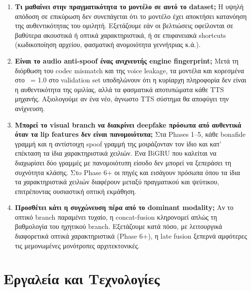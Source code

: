 \begin{enumerate}

  \item \textbf{Τι μαθαίνει στην πραγματικότητα το μοντέλο σε αυτό το dataset;}
    Η υψηλή απόδοση σε επικύρωση δεν συνεπάγεται ότι το μοντέλο
    έχει αποκτήσει κατανόηση της αυθεντικότητας του ομιλητή.
    Εξετάζουμε εάν οι βελτιώσεις οφείλονται σε βαθύτερα ακουστικά
    ή οπτικά χαρακτηριστικά, ή σε επιφανειακά shortcuts
    (κωδικοποίηση αρχείου, φασματική ανομοιότητα γεννήτριας κ.ά.).

  \item \textbf{Είναι το audio anti-spoof ένας ανιχνευτής engine fingerprint;}
    Μετά τη διόρθωση του codec mismatch και της voice leakage,
    τα μοντέλα  και  κορεσμένα
    στο \AUC{}~= 1.0 στο validation set υποδηλώνουν ότι
    η κυρίαρχη πληροφορία δεν είναι η αυθεντικότητα της ομιλίας,
    αλλά τα φασματικά αποτυπώματα κάθε TTS μηχανής.
    Αξιολογούμε αν ένα νέο, άγνωστο TTS σύστημα
    θα αποφύγει την ανίχνευση.

  \item \textbf{Μπορεί το visual branch να διακρίνει deepfake πρόσωπα από
    αυθεντικά όταν τα lip features δεν είναι πανομοιότυπα;}
    Στα Phases 1–5, κάθε bonafide γραμμή και η αντίστοιχη spoof γραμμή
    της μοιράζονταν τον ίδιο 
    και κατ' επέκταση τα ίδια  χαρακτηριστικά χειλιών.
    Ένα BiGRU που καλείται να διαχωρίσει δύο γραμμές με πανομοιότυπη
    είσοδο δεν μπορεί να ξεπεράσει τη συχνότητα κλάσης.
    Στo Phase 6+ οι πηγές  και 
    εισάγουν πρόσωπα όπου τα ίδια τα χαρακτηριστικά χειλιών διαφέρουν
    μεταξύ πραγματικού και ψεύτικου, επιτρέποντας ουσιαστική
    οπτική εκμάθηση.

  \item \textbf{Προσθέτει κάτι η συγχώνευση πέρα από το dominant modality;}
    Αν το οπτικό branch παραμένει τυχαίο, η concat-fusion
    κληρονομεί απλώς τη βαθμολογία του ηχητικού branch.
    Εξετάζουμε κατά πόσο, με λειτουργικά διαφορετικά οπτικά
    χαρακτηριστικά (Phase 6+), η late fusion ξεπερνά
    αμφότερες τις μεμονωμένες μονότροπες αρχιτεκτονικές.

\end{enumerate}

\section{Εργαλεία και Τεχνολογίες}

